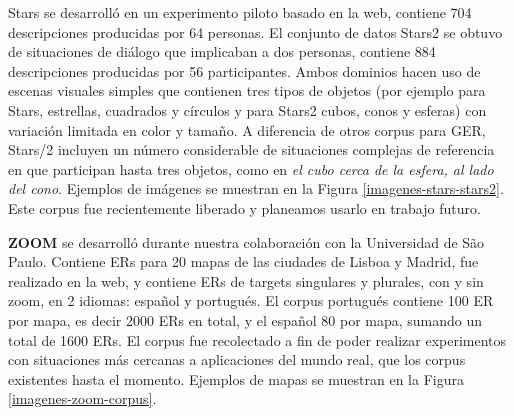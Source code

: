 Stars se desarroll\'o en un experimento piloto basado en la web, contiene 704 descripciones producidas por 64 personas. El conjunto de datos Stars2 se obtuvo de situaciones de di\'alogo que implicaban a dos personas, contiene 884 descripciones producidas por 56 participantes. Ambos dominios hacen uso de escenas visuales simples que contienen tres tipos de objetos (por ejemplo para Stars, estrellas, cuadrados y c\'irculos y para Stars2 cubos, conos y esferas) con variaci\'on limitada en color y tama\~no. 
A diferencia de otros corpus para GER, Stars/2 incluyen un n\'umero considerable de situaciones complejas de referencia en que participan hasta tres objetos, como en {\it el cubo cerca de la esfera, al lado del cono}. Ejemplos de im\'agenes se muestran en la Figura \ref{imagenes-stars-stars2}. Este corpus fue recientemente liberado y planeamos usarlo en trabajo futuro.


\label{sec:corpusZOOM}
{\bf ZOOM} \cite{DBLP:conf/acl/AltamiranoFPB15} se desarroll\'o durante nuestra colaboraci\'on con la Universidad de S\~ao Paulo. Contiene ERs para 20 mapas de las ciudades de Lisboa y Madrid, fue realizado en la web, y contiene ERs de targets singulares y plurales, con y sin zoom, en 2 idiomas: espa\~nol y portugu\'es. El corpus portugu\'es contiene 100 ER por mapa, es decir 2000 ERs en total, y el espa\~nol 80 por mapa, sumando un total de 1600 ERs. El corpus fue recolectado a fin de poder realizar experimentos con situaciones m\'as cercanas a aplicaciones del mundo real, que los corpus existentes hasta el momento. Ejemplos de mapas se muestran en la Figura \ref{imagenes-zoom-corpus}.



